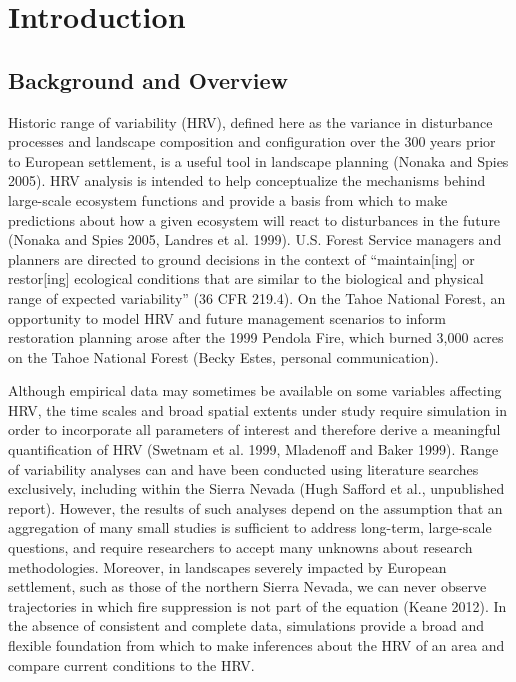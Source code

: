 \chapter{Introduction}

\section{Background and Overview}

Historic range of variability (HRV), defined here as the variance in disturbance processes and landscape composition and configuration over the 300 years prior to European settlement, is a useful tool in landscape planning (Nonaka and Spies 2005). HRV analysis is intended to help conceptualize the mechanisms behind large-scale ecosystem functions and provide a basis from which to make predictions about how a given ecosystem will react to disturbances in the future (Nonaka and Spies 2005, Landres et al. 1999). U.S. Forest Service managers and planners are directed to ground decisions in the context of ``maintain[ing] or restor[ing] ecological conditions that are similar to the biological and physical range of expected variability'' (36 CFR 219.4). On the Tahoe National Forest, an opportunity to model HRV and future management scenarios to inform restoration planning arose after the 1999 Pendola Fire, which burned 3,000 acres on the Tahoe National Forest (Becky Estes, personal communication).

Although empirical data may sometimes be available on some variables affecting HRV, the time scales and broad spatial extents under study require simulation in order to incorporate all parameters of interest and therefore derive a meaningful quantification of HRV (Swetnam et al. 1999, Mladenoff and Baker 1999). Range of variability analyses can and have been conducted using literature searches exclusively, including within the Sierra Nevada (Hugh Safford et al., unpublished report). However, the results of such analyses depend on the assumption that an aggregation of many small studies is sufficient to address long-term, large-scale questions, and require researchers to accept many unknowns about research methodologies. Moreover, in landscapes severely impacted by European settlement, such as those of the northern Sierra Nevada, we can never observe trajectories in which fire suppression is not part of the equation (Keane 2012). In the absence of consistent and complete data, simulations provide a broad and flexible foundation from which to make inferences about the HRV of an area and compare current conditions to the HRV.

